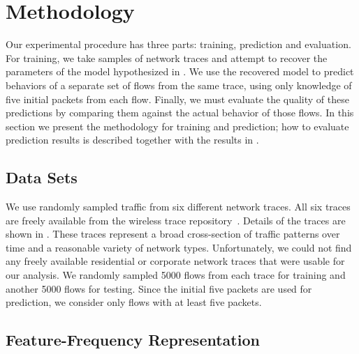 \documentclass{acm_proc_article-sp}
\begin{document}
\section{Methodology}

Our experimental procedure has three parts:
training, prediction and evaluation.
For training, we take samples of network traces and attempt to recover the parameters of the model hypothesized in .
We use the recovered model to predict behaviors of a separate set of flows from the same trace, using only knowledge of five initial packets from each flow.
Finally, we must evaluate the quality of these predictions by comparing them against the actual behavior of those flows.
In this section we present the methodology for training and prediction;
how to evaluate prediction results is described together with the results in .

\subsection{Data Sets}

We use randomly sampled traffic from six different network traces.
All six traces are freely available from the  wireless trace repository~\cite{Yeo06}.
Details of the traces are shown in .
These traces represent a broad cross-section of traffic patterns over time and a reasonable variety of network types.
Unfortunately, we could not find any freely available residential or corporate network traces that were usable for our analysis.
We randomly sampled 5000 flows from each trace for training and another 5000 flows for testing.
Since the initial five packets are used for prediction, we consider only flows with at least five packets.

\subsection{Feature-Frequency Representation}
\end{document}

